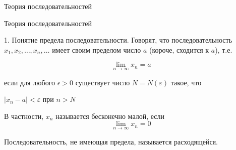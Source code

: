 \documentclass{article}
\begin{document}
Теория последовательностей

Теория последовательностей

1. Понятие предела последовательности. Говорят, что последовательность $x_1,x_2,\ldots,x_n, \ldots$ имеет своим пределом число $a$ (короче, сходится к $a$), т.е.

\[
\lim_{n \to \infty} x_n = a
\]

если для любого $\epsilon > 0$ существует число $N = N(\varepsilon)$ такое, что

$|x_n - a| < \varepsilon$ при $n > N$

В частности, $x_n$ называется бесконечно малой, если
\[
\lim_{n \to \infty} x_n = 0
\]

Последовательность, не имеющая предела, называется расходящейся.
    
\end{document}
